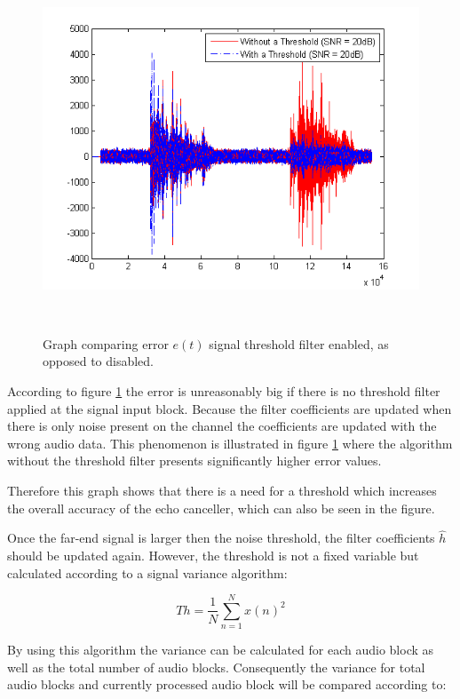 \documentclass[a4paper,11pt,twoside]{article}
\begin{document}
\begin{figure} \
  \centering  
	\includegraphics[width=1\textwidth]{Threshold.png}
  	\caption{Graph comparing error $e(t)$ signal threshold filter enabled, as opposed to disabled.}
  	\label{fig:threshold}
\ \end{figure}

According to figure \ref{fig:threshold} the error is unreasonably big if there is no threshold filter applied at the signal input block. Because the filter coefficients are updated when there is only noise present on the channel the coefficients are updated with the wrong audio data. This phenomenon is illustrated in figure \ref{fig:threshold} where the algorithm without the threshold filter presents significantly higher error values.

Therefore this graph shows that there is a need for a threshold which increases the overall accuracy of the echo canceller, which can also be seen in the figure. 

Once the far-end signal is larger then the noise threshold, the filter coefficients $\hat{h}$ should be updated again. However, the threshold is not a fixed variable but calculated according to a signal variance algorithm:

\begin{equation}
Th =  \frac{1}{N} \sum_{n=1}^{N} x(n)^2
\end{equation}

By using this algorithm the variance can be calculated for each audio block as well as the total number of audio blocks. Consequently the variance for total audio blocks and currently processed audio block will be compared according to:
\end{document}
